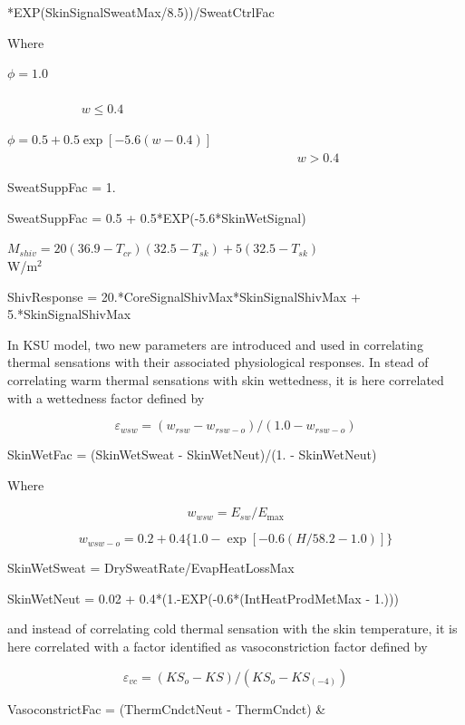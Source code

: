 *EXP(SkinSignalSweatMax/8.5))/SweatCtrlFac

Where

\(\phi = 1.0\) ~~~~~~~~~~~~~~~~~~~~~~~~~~~~~~~~~~~~~~~~~~~~~~~~~~~~~~~~~~~~~~~~~~~~~~~~~~~~~~~~~~~ \(w \le 0.4\)

\(\phi = 0.5 + 0.5\exp [ - 5.6(w - 0.4)]\) ~~~~~~~~~~~~~~~~~~~~~~~~~~~~~~~~~~~~~~~~~~~~~ \(w > 0.4\)

SweatSuppFac = 1.

SweatSuppFac = 0.5 + 0.5*EXP(-5.6*SkinWetSignal)

\({M_{shiv}} = 20(36.9 - {T_{cr}})(32.5 - {T_{sk}}) + 5(32.5 - {T_{sk}})\) ~~~~~~~~~~~~~~~~~~~~ W/m\(^{2}\)

ShivResponse = 20.*CoreSignalShivMax*SkinSignalShivMax + 5.*SkinSignalShivMax

In KSU model, two new parameters are introduced and used in correlating thermal sensations with their associated physiological responses. In stead of correlating warm thermal sensations with skin wettedness, it is here correlated with a wettedness factor defined by

\begin{equation}
{\varepsilon_{wsw}} = ({w_{rsw}} - {w_{rsw - o}})/(1.0 - {w_{rsw - o}})
\end{equation}

SkinWetFac = (SkinWetSweat - SkinWetNeut)/(1. - SkinWetNeut)

Where

\begin{equation}
{w_{wsw}} = {E_{sw}}/{E_{\max }}
\end{equation}

\begin{equation}
{w_{wsw - o}} = 0.2 + 0.4\{ 1.0 - \exp [ - 0.6(H/58.2 - 1.0)]\}
\end{equation}

SkinWetSweat = DrySweatRate/EvapHeatLossMax

SkinWetNeut = 0.02 + 0.4*(1.-EXP(-0.6*(IntHeatProdMetMax - 1.)))

and instead of correlating cold thermal sensation with the skin temperature, it is here correlated with a factor identified as vasoconstriction factor defined by

\begin{equation}
{\varepsilon_{vc}} = (K{S_o} - KS)/(K{S_o} - K{S_{( - 4)}})
\end{equation}

VasoconstrictFac = (ThermCndctNeut - ThermCndct) \&

